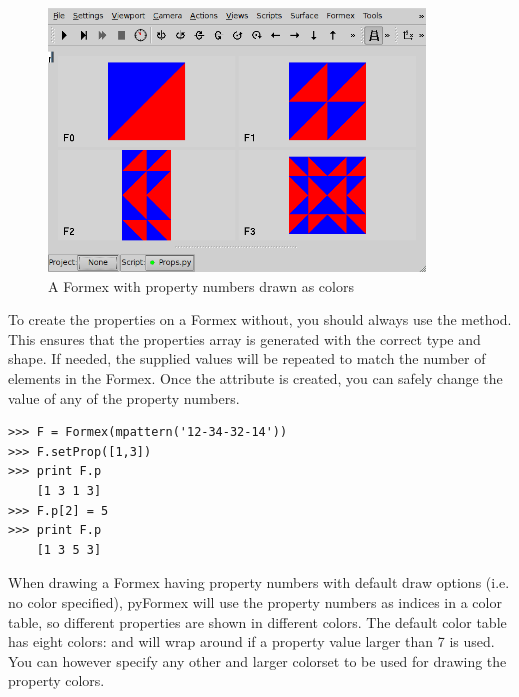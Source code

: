 \begin{figure}[ht]
  \centering
  \begin{makeimage}
  \end{makeimage}
  \begin{latexonly}
    \includegraphics[width=10cm]{images/props}
  \end{latexonly}
  \begin{htmlonly}
  \end{htmlonly}  
  \caption{A Formex with property numbers drawn as colors}
  \label{fig:props}
\end{figure}

To create the properties on a Formex without, you should always use the  method. This ensures that the properties array is generated with the correct type and shape. If needed, the supplied values will be repeated to match the number of elements in the Formex. Once the  attribute is created, you can safely change the value of any of the property numbers.
\begin{verbatim}
>>> F = Formex(mpattern('12-34-32-14'))
>>> F.setProp([1,3])
>>> print F.p
    [1 3 1 3]
>>> F.p[2] = 5
>>> print F.p
    [1 3 5 3]   
\end{verbatim}

When drawing a Formex having property numbers with default draw options (i.e. no color specified), pyFormex will use the property numbers as indices in a color table, so different properties are shown in different colors. The default color table has eight colors:  and will wrap around if a property value larger than 7 is used. You can however specify any other and larger colorset to be used for drawing the property colors.  



